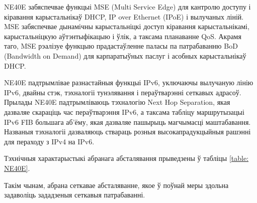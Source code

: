 NE40E забяспечвае функцыі MSE (Multi Service Edge) для кантролю доступу і кіравання карыстальнікаў DHCP, IP over Ethernet (IPoE) і вылучаных ліній. MSE забяспечвае дынамічны карыстальніцкі доступ кіравання карыстальнікамі,
карыстальніцкую аўтэнтыфікацыю і ўлік, а таксама планаванне QoS. Акрамя таго, MSE рэалізуе функцыю прадастаўленне паласы па патрабаванню BoD (Bandwidth on Demand) для карпаратыўных паслуг і асобных карыстальнікаў DHCP.

NE40E падтрымлівае разнастайныя функцыі IPv6, уключаючы вылучаную лінію IPv6, двайны стэк, тэхналогіі тунэлявання і пераўтварэнні сеткавых адрасоў. Прылады NE40E падтрымліваюць тэхналогію Next Hop Separation, якая дазваляе скараціць час пераўтварэння IPv6, а таксама табліцу маршрутызацыі IPv6 FIB большага аб'ёму, якая дазваляе пашырыць магчымасці маштабавання. Названыя тэхналогіі дазваляюць ствараць розныя высокапрадукцыйныя рашэнні для пераходу з IPv4 на IPv6.

Тэхнічныя характарыстыкі абранага абсталявання прыведзены ў
табліцы \ref{table: NE40E}.

Такім чынам, абрана сеткавае абсталяванне, якое ў поўнай меры здольна задаволіць зададзеныя сеткавыя патрабаванні.
